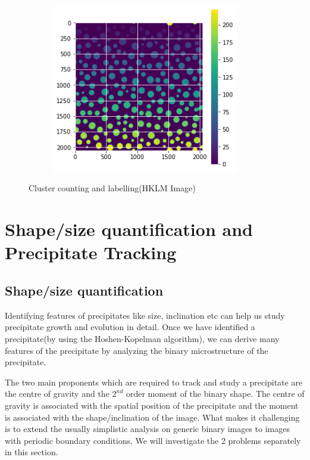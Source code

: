 \documentclass[12pt, a4paper]{report}
\begin{document}
\begin{figure}[H]
\centering
\begin{subfigure}{.6\textwidth}
  \centering
  \includegraphics[width=0.9\textwidth]{Pictures/Hoshen/Hoshen_kopleman.jpeg}
\end{subfigure}
\caption{Cluster counting and labelling(HKLM Image)}
\label{fig:hoshKopExImg}
\end{figure}



\section{Shape/size quantification and Precipitate Tracking}

\subsection{Shape/size quantification}
Identifying features of precipitates like size, inclination etc can help us study precipitate growth and evolution in detail. Once we have identified a precipitate(by using the Hoshen-Kopelman algorithm), we can derive many features of the precipitate by analyzing the binary microstructure of the precipitate.

The two main proponents which are required to track and study a precipitate are the centre of gravity and the $2^{nd}$ order moment of the binary shape. The centre of gravity is associated with the spatial position of the precipitate and the moment is associated with the shape/inclination of the image. What makes it challenging is to extend the usually simplistic analysis on generic binary images to images with periodic boundary conditions. We will investigate the 2 problems separately in this section.
\end{document}
